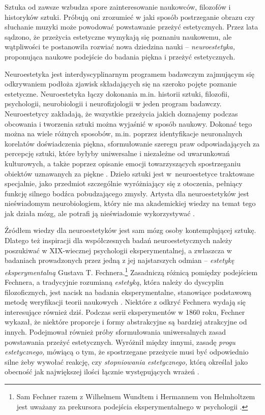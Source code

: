 \documentclass[licencjacka]{kdypl}
\begin{document}
Sztuka od zawsze wzbudza spore zainteresowanie naukowców, filozofów i historyków sztuki. Próbują oni zrozumieć w jaki sposób postrzeganie obrazu czy słuchanie muzyki może powodować powstawanie przeżyć estetycznych. Przez lata sądzono, że przeżycia estetyczne wymykają się poznaniu naukowemu, ale wątpliwości te postanowiła rozwiać nowa dziedzina nauki -- \textit{neuroestetyka,} proponująca naukowe podejście do badania piękna i przeżyć estetycznych.

Neuroestetyka jest interdyscyplinarnym programem badawczym zajmującym się odkrywaniem podłoża zjawisk składających się na szeroko pojęte poznanie estetyczne. Neuroestetyka łączy dokonania m.in. historii sztuki, filozofii, psychologii, neurobiologii i neurofizjologii w jeden program badawczy. Neuroestetycy zakładają, że wszystkie przeżycia jakich doznajemy podczas obcowania i tworzenia sztuki można wyjaśnić w sposób naukowy. Dokonać tego można na wiele różnych sposobów, m.in. poprzez identyfikacje neuronalnych korelatów doświadczenia piękna, sformułowanie szeregu praw odpowiadających za percepcję sztuki, które byłyby uniwersalne i niezależne od uwarunkowań kulturowych, a także poprzez opisanie emocji towarzyszących spostrzeganiu obiektów uznawanych za piękne \citep[s. 112]{przybysz2016}. Dzieło sztuki jest w~neuroestetyce traktowane specjalnie, jako przedmiot szczególnie wyróżniający się z otoczenia, pełniący funkcję silnego bodźca pobudzającego zmysły. Artysta dla neuroestetyków jest nieświadomym neurobiologiem, który nie ma akademickiej wiedzy na temat tego jak działa mózg, ale potrafi ją nieświadomie wykorzystywać \citep[s. 19]{neurobiolog}. 

Źródłem wiedzy dla neuroestetyków jest sam mózg osoby kontemplującej sztukę. Dlatego też inspiracji dla współczesnych badań neuroestetycznych należy poszukiwać w XIX-wiecznej psychologii eksperymentalnej, a zwłaszcza w badaniach prowadzonych przez jedną z jej najstarszych odmian -- \textit{estetykę eksperymentalną} Gustava T. Fechnera.\footnote{Sam Fechner razem z Wilhelmem Wundtem i Hermannem von Helmholtzem jest uważany za prekursora podejścia eksperymentalnego w psychologii \citep[s. 11]{Bremer}.} Zasadniczą różnicą pomiędzy podejściem Fechnera, a tradycyjnie rozumianą \textit{estetyką}, która należy do dyscyplin filozoficznych, jest nacisk na badania eksperymentalne, stanowiące podstawową metodę weryfikacji teorii naukowych \citep[s. 11]{Bremer}. Niektóre z odkryć Fechnera wydają się interesujące również dziś. Podczas serii eksperymentów w 1860 roku, Fechner wykazał, że niektóre proporcje i formy abstrakcyjne są bardziej atrakcyjne od innych. Podejmował również próby sformułowania uniwersalnych zasad powstawania przeżyć estetycznych. Wyróżnił między innymi, zasadę \textit{progu estetycznego,} mówiącą o tym, że spostrzegane przeżycie musi być odpowiednio silne żeby wywołać reakcję, czy \textit{stopniowania estetycznego,} którą określał jako obecność jak największej ilości łącznie występujących wrażeń \citep[s. 11-12]{Bremer}.
\end{document}
